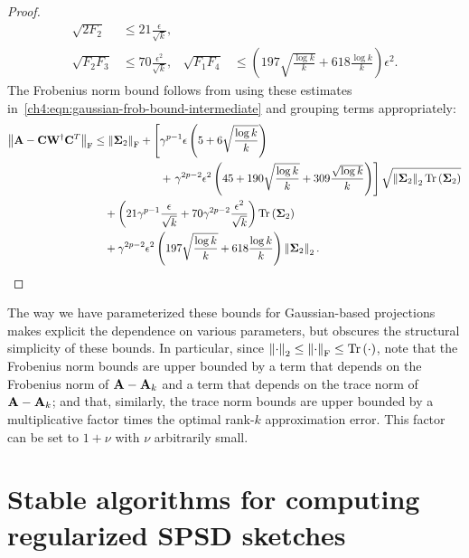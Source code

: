 \begin{proof}
\begin{align*}
\sqrt{2 F_2} & \leq 21 \frac{\epsilon}{\sqrt{k}}, \\
\sqrt{F_2 F_3} & \leq 70 \frac{\epsilon^2}{\sqrt{k}}, &
\sqrt{F_1 F_4} & \leq 
 \left(197 \sqrt{\frac{\log k}{k}} + 618 \frac{\log k}{k} \right) \epsilon^2.
\end{align*}
The Frobenius norm bound follows from using these estimates in~\eqref{ch4:eqn:gaussian-frob-bound-intermediate} and grouping terms
appropriately:
\begin{align*}
 \left\|\mathbf{A} - \mathbf{C} \mathbf{W}^\dagger \mathbf{C}^T\right\|_\mathrm{F} & \leq
 \left\|\mathbf{\Sigma}_2\right\|_\mathrm{F} + \left[ 
   \gamma^{p-1} \epsilon \left(5 + 6 \sqrt{\frac{\log k}{k}} \right) \right. \\
  & \quad \quad \quad \quad \quad \quad + \left. \gamma^{2p-2}\epsilon^2 
    \left(45 + 
        190 \sqrt{\frac{\log k}{k}} + 309 \frac{\sqrt{\log k}}{k}
     \right) \right] 
     \sqrt{\left\|\mathbf{\Sigma}_2\right\|_2 \operatorname{Tr}\left(\mathbf{\Sigma}_2\right)} \\
  & \quad + \left( 21 \gamma^{p-1} \frac{\epsilon}{\sqrt{k}} 
                   + 70 \gamma^{2p-2} \frac{\epsilon^2}{\sqrt{k}} \right)
            \operatorname{Tr}\left(\mathbf{\Sigma}_2\right) \\
  & \quad + \gamma^{2p-2} \epsilon^2 \left(197 \sqrt{\frac{\log k}{k}} 
                                 + 618 \frac{\log k}{k} \right) 
             \left\|\mathbf{\Sigma}_2\right\|_2.
\end{align*}
\end{proof}


\begin{remark}
The way we have parameterized these bounds for Gaussian-based projections 
makes explicit the dependence on various parameters, but obscures the 
structural simplicity of these bounds.
In particular, since $\left\|\cdot\right\|_2 \le \left\|\cdot\right\|_\mathrm{F} \le \operatorname{Tr}\left(\cdot\right)$, 
note that the Frobenius norm bounds are upper bounded by a term that depends 
on the Frobenius norm of $\mathbf{A} - \mathbf{A}_k$ and a term that depends on the trace 
norm of $\mathbf{A} - \mathbf{A}_k$; and that, similarly, the trace norm bounds are upper 
bounded by a multiplicative factor times the optimal rank-$k$ approximation error.
This factor can be set to $1+\nu$ with $\nu$ arbitrarily small.
\end{remark}

\section{Stable algorithms for computing regularized SPSD sketches}
\label{ch4:sec:stablealgs}

